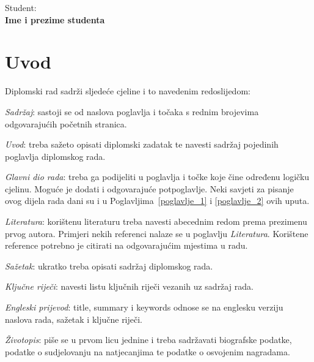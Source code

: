 \documentclass{mathos}
\begin{document}
\begin{titlepage}
\begin{minipage}[t]{0.47\textwidth}

\end{minipage}
\hfill
\begin{minipage}[t]{0.47\textwidth}\raggedleft
	{{Student:}{\normalsize\vspace{3mm} \bf\\ \large{Ime i prezime studenta}}}
\end{minipage}

\vspace*{\fill}
\end{titlepage}


\tableofcontents
\thispagestyle{empty}


\chapter{Uvod}\label{Uvod}

\noindent
Diplomski rad sadrži sljedeće cjeline i to navedenim redoslijedom:
\bigskip

{\it Sadržaj}: sastoji se od naslova poglavlja i točaka s rednim brojevima odgovarajućih početnih
stranica.

{\it Uvod}: treba sažeto opisati diplomski zadatak te navesti sadržaj pojedinih
poglavlja diplomskog rada.

{\it Glavni dio rada}: treba ga podijeliti u poglavlja i točke koje
čine određenu logičku cjelinu. Moguće je dodati i odgovarajuće potpoglavlje.
Neki savjeti za pisanje ovog dijela rada dani su i u Poglavljima~\ref{poglavlje_1} i \ref{poglavlje_2} ovih uputa.

{\it Literatura}: korištenu literaturu treba navesti abecednim redom prema prezimenu prvog autora.
Primjeri nekih referenci nalaze se u poglavlju {\it Literatura}. Korištene reference potrebno je
citirati na odgovarajućim mjestima u radu.

{\it Sažetak}: ukratko treba opisati sadržaj diplomskog rada.

{\it Ključne riječi}: navesti listu ključnih riječi vezanih uz sadržaj rada.

{\it Engleski prijevod}: title, summary i keywords odnose se na englesku verziju naslova rada,
sažetak i ključne riječi.

{\it Životopis}: piše se u prvom licu jednine i treba sadržavati biografske podatke,
podatke o sudjelovanju na natjecanjima te podatke o osvojenim nagradama.
\end{document}
